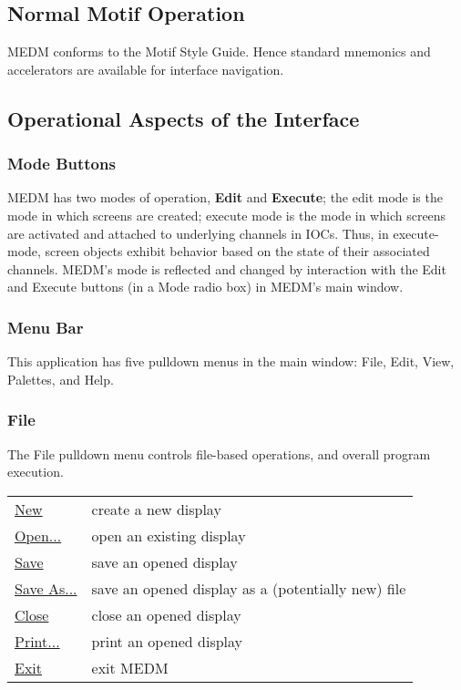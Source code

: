\subsection{Normal Motif Operation}

MEDM conforms to the Motif Style Guide.  Hence standard mnemonics and
accelerators are available for interface navigation. 


\subsection{Operational Aspects of the Interface}

\subsubsection{Mode Buttons}

MEDM has two modes of operation, {\bf Edit} and {\bf Execute};
the edit mode is the mode in which screens are created; execute mode is the
mode in which screens are activated and attached to underlying channels in IOCs.
Thus, in execute-mode, screen objects exhibit behavior based on the state of
their associated channels.  MEDM's mode is reflected and changed by
interaction with the Edit and Execute buttons (in a Mode radio box) in
MEDM's main window.

\subsubsection{Menu Bar}

This application has five pulldown menus in the main window:
File, Edit, View, Palettes, and Help.

\subsubsection{File}

The File pulldown menu controls file-based operations, and overall program
execution.\\

\begin{tabular}{ll}
\underline{New} & create a new display\\
\underline{Open...} & open an existing display\\
\underline{Save} & save an opened display\\
\underline{Save As...} & save an opened display as a (potentially new) file\\
\underline{Close} & close an opened display\\
\underline{Print...} & print an opened display\\
\underline{Exit} & exit MEDM\\
\end{tabular}


